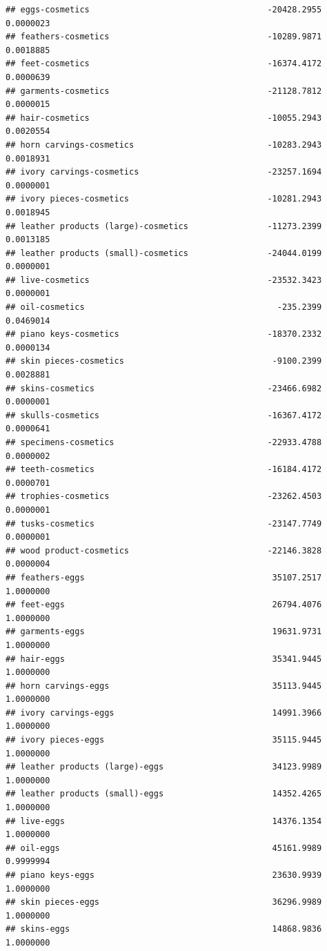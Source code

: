\documentclass[
  12pt,
]{article}
\begin{document}
\begin{verbatim}
## eggs-cosmetics                                    -20428.2955 0.0000023
## feathers-cosmetics                                -10289.9871 0.0018885
## feet-cosmetics                                    -16374.4172 0.0000639
## garments-cosmetics                                -21128.7812 0.0000015
## hair-cosmetics                                    -10055.2943 0.0020554
## horn carvings-cosmetics                           -10283.2943 0.0018931
## ivory carvings-cosmetics                          -23257.1694 0.0000001
## ivory pieces-cosmetics                            -10281.2943 0.0018945
## leather products (large)-cosmetics                -11273.2399 0.0013185
## leather products (small)-cosmetics                -24044.0199 0.0000001
## live-cosmetics                                    -23532.3423 0.0000001
## oil-cosmetics                                       -235.2399 0.0469014
## piano keys-cosmetics                              -18370.2332 0.0000134
## skin pieces-cosmetics                              -9100.2399 0.0028881
## skins-cosmetics                                   -23466.6982 0.0000001
## skulls-cosmetics                                  -16367.4172 0.0000641
## specimens-cosmetics                               -22933.4788 0.0000002
## teeth-cosmetics                                   -16184.4172 0.0000701
## trophies-cosmetics                                -23262.4503 0.0000001
## tusks-cosmetics                                   -23147.7749 0.0000001
## wood product-cosmetics                            -22146.3828 0.0000004
## feathers-eggs                                      35107.2517 1.0000000
## feet-eggs                                          26794.4076 1.0000000
## garments-eggs                                      19631.9731 1.0000000
## hair-eggs                                          35341.9445 1.0000000
## horn carvings-eggs                                 35113.9445 1.0000000
## ivory carvings-eggs                                14991.3966 1.0000000
## ivory pieces-eggs                                  35115.9445 1.0000000
## leather products (large)-eggs                      34123.9989 1.0000000
## leather products (small)-eggs                      14352.4265 1.0000000
## live-eggs                                          14376.1354 1.0000000
## oil-eggs                                           45161.9989 0.9999994
## piano keys-eggs                                    23630.9939 1.0000000
## skin pieces-eggs                                   36296.9989 1.0000000
## skins-eggs                                         14868.9836 1.0000000

\end{verbatim}
\end{document}
